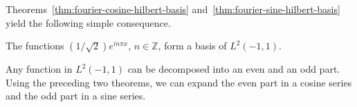 Theorems~\ref{thm:fourier-cosine-hilbert-basis} and~\ref{thm:fourier-sine-hilbert-basis} yield the following simple consequence.

\begin{Corollary}
\label{cor:fourier-complex-hilbert-basis}
The functions $(1/\sqrt2)e^{in\pi x}$, $n\in\mathbb{Z}$, form a basis of $L^2(-1,1)$.
\end{Corollary}

\begin{Proof}
Any function in $L^2(-1,1)$ can be decomposed into an even and an odd part. Using the preceding two theorems, we can expand the even part in a cosine series and the odd part in a sine series.
\end{Proof}
